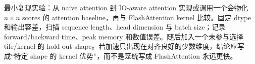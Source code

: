 \begin{importantbox}{最小复现实验：从 naive attention 到 IO-aware attention}
实现或调用一个会物化 $n\times n$ scores 的 attention baseline，再与 FlashAttention kernel 比较。固定 dtype 和输出容差，扫描 sequence length、head dimension 与 batch size；记录 forward/backward time、peak memory 和数值误差。随后加入一个未参与选择 tile/kernel 的 hold-out shape。若加速只出现在对齐良好的少数维度，结论应写成“特定 shape 的 kernel 优势”，而不是笼统写成 FlashAttention 永远更快。
\end{importantbox}


